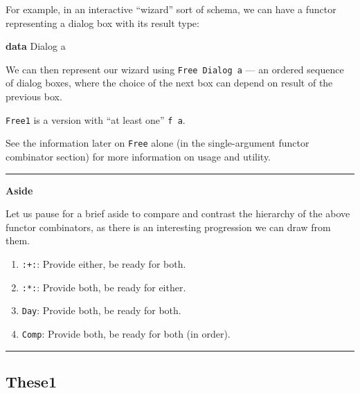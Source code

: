 \documentclass[]{article}
\newenvironment{Shaded}{}{}
\newcommand{\DataTypeTok}[1]{\textcolor[rgb]{0.56,0.13,0.00}{#1}}
\newcommand{\KeywordTok}[1]{\textcolor[rgb]{0.00,0.44,0.13}{\textbf{#1}}}
\newcommand{\NormalTok}[1]{#1}
\begin{document}
\begin{itemize}
  For example, in an interactive ``wizard'' sort of schema, we can have a
  functor representing a dialog box with its result type:

\begin{Shaded}
\begin{Highlighting}[]
\KeywordTok{data} \DataTypeTok{Dialog}\NormalTok{ a}
\end{Highlighting}
\end{Shaded}

  We can then represent our wizard using \texttt{Free\ Dialog\ a} --- an ordered
  sequence of dialog boxes, where the choice of the next box can depend on
  result of the previous box.

  \texttt{Free1} is a version with ``at least one'' \texttt{f\ a}.

  See the information later on \texttt{Free} alone (in the single-argument
  functor combinator section) for more information on usage and utility.
\end{itemize}

\begin{center}\rule{0.5\linewidth}{0.5pt}\end{center}

\textbf{Aside}

Let us pause for a brief aside to compare and contrast the hierarchy of the
above functor combinators, as there is an interesting progression we can draw
from them.

\begin{enumerate}
\def\labelenumi{\arabic{enumi}.}
\tightlist
\item
  \texttt{:+:}: Provide either, be ready for both.
\item
  \texttt{:*:}: Provide both, be ready for either.
\item
  \texttt{Day}: Provide both, be ready for both.
\item
  \texttt{Comp}: Provide both, be ready for both (in order).
\end{enumerate}

\begin{center}\rule{0.5\linewidth}{0.5pt}\end{center}

\subsection{These1}\label{these1}
\end{document}
